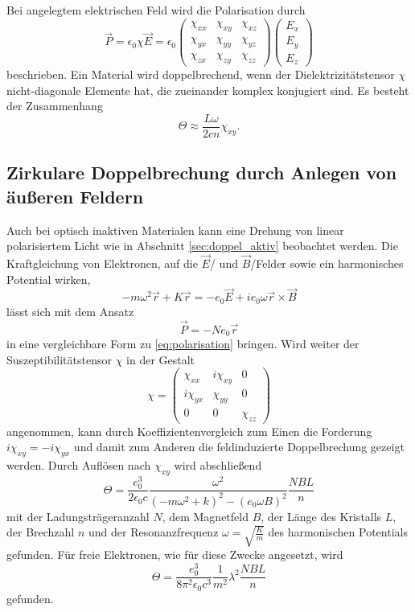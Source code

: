 Bei angelegtem elektrischen Feld wird die Polarisation durch
\begin{equation}
    \vec P = \epsilon_0 \chi \vec E = \epsilon_0 \begin{pmatrix} \chi_{xx} & \chi_{xy} & \chi_{xz} \\ \chi_{yx} & \chi_{yy} & \chi_{yz} \\ \chi_{zx} & \chi_{zy} & \chi_{zz} \end{pmatrix} \begin{pmatrix} E_x\\E_y\\E_z \end{pmatrix}
    \label{eq:polarisation}
\end{equation}
beschrieben.
Ein Material wird doppelbrechend, wenn der Dielektrizitätstensor $\chi$ nicht-diagonale Elemente hat, die zueinander komplex konjugiert sind.
Es besteht der Zusammenhang
\begin{equation}
    \Theta \approx \frac{L\omega}{2cn}\chi_{xy}.
\end{equation}
\subsection{Zirkulare Doppelbrechung durch Anlegen von äußeren Feldern}
Auch bei optisch inaktiven Materialen kann eine Drehung von linear polarisiertem Licht wie in Abschnitt \ref{sec:doppel_aktiv} beobachtet werden.
Die Kraftgleichung von Elektronen, auf die $\vec E$\-/ und $\vec B$\-/Felder sowie ein harmonisches Potential wirken,
\begin{equation}
    -m\omega^2\vec r + K \vec r = -e_0 \vec E + i e_0 \omega \vec r \times \vec B
\end{equation}
lässt sich mit dem Ansatz
\begin{equation}
    \vec P = - N e_0 \vec r
\end{equation}
in eine vergleichbare Form zu \eqref{eq:polarisation} bringen.
Wird weiter der Suszeptibilitätstensor $\chi$ in der Gestalt
\begin{equation}
    \chi = \begin{pmatrix} \chi_{xx} & i\chi_{xy} & 0 \\ i\chi_{yx} & \chi_{yy} & 0\\ 0 & 0 & \chi_{zz} \end{pmatrix}
\end{equation}
angenommen, kann durch Koeffizientenvergleich zum Einen die Forderung $i\chi_{xy}=-i\chi_{yx}$ und damit zum Anderen die feldinduzierte Doppelbrechung gezeigt werden.
Durch Auflösen nach $\chi_{xy}$ wird abschließend
\begin{equation}
    \Theta = \frac{e_0^3}{2\epsilon_0 c} \frac{\omega^2}{(-m\omega^2+k)^2-(e_0\omega B)^2} \frac{NBL}{n}
\end{equation}
mit der Ladungsträgeranzahl $N$, dem Magnetfeld $B$, der Länge des Kristalls $L$, der Brechzahl $n$ und der Resonanzfrequenz $\omega = \sqrt{\frac{K}{m}}$ des harmonischen Potentials gefunden.
Für freie Elektronen, wie für diese Zwecke angesetzt, wird
\begin{equation}
    \Theta = \frac{e_0^3}{8\pi^2\epsilon_0 c^3} \frac{1}{m^2} \lambda^2 \frac{NBL}{n}
\end{equation}
gefunden.
